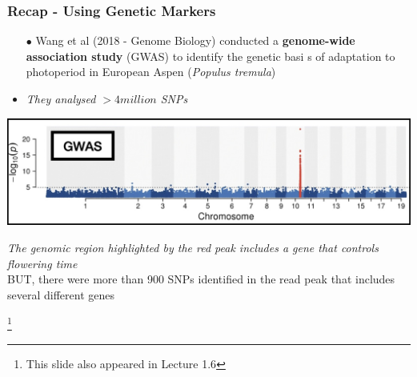 \documentclass[xcolor=dvipsnames]{beamer}
\newcommand\blfootnote[1]{%
	\begingroup
	\renewcommand\thefootnote{}\footnote{#1}%
	\addtocounter{footnote}{-1}%
	\endgroup
}
\begin{document}
\begin{frame}
	       \frametitle{Recap - Using Genetic Markers}
	       \scriptsize 
	       \begin{itemize} 
		               \item[$\bullet$] Wang et al (2018 - Genome Biology) conducted a \textbf{genome-wide association study} (GWAS) to identify the genetic basi
		s of adaptation to photoperiod in European Aspen (\textit{Populus tremula}) 
		               \item \textit{They analysed $>4 million$ SNPs } \pause
		       \end{itemize}
	       
	       \includegraphics[keepaspectratio, width  = \textwidth]{img/gwas}
	       
	       \textit{The genomic region highlighted by the red peak includes a gene that controls flowering time} \pause\\
	       BUT, there were more than 900 SNPs identified in the read peak that includes several different genes
	       
	       \blfootnote{This slide also appeared in Lecture 1.6}
	\end{frame}
\end{document}
